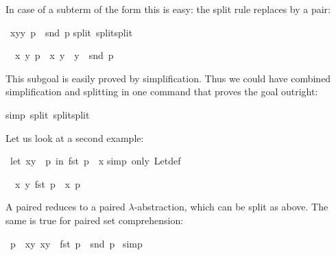 \begin{isabellebody}
\begin{isamarkuptext}
In case of a subterm of the form  this is easy: the split
rule  replaces  by a pair:%
\end{isamarkuptext}%
\ {\isachardoublequote}{\isacharparenleft}{\isasymlambda}{\isacharparenleft}x{\isacharcomma}y{\isacharparenright}{\isachardot}y{\isacharparenright}\ p\ {\isacharequal}\ snd\ p{\isachardoublequote}\isanewline
{}split\ split{\isacharunderscore}split{\isacharparenright}%
\begin{isamarkuptxt}%
\begin{isabelle}%
\ {}{\isachardot}\ {\isasymforall}x\ y{\isachardot}\ p\ {\isacharequal}\ {\isacharparenleft}x{\isacharcomma}\ y{\isacharparenright}\ {\isasymlongrightarrow}\ y\ {\isacharequal}\ snd\ p%
\end{isabelle}
This subgoal is easily proved by simplification. Thus we could have combined
simplification and splitting in one command that proves the goal outright:%
\end{isamarkuptxt}%
simp\ split{\isacharcolon}\ split{\isacharunderscore}split{\isacharparenright}%
\begin{isamarkuptext}%
Let us look at a second example:%
\end{isamarkuptext}%
\ {\isachardoublequote}let\ {\isacharparenleft}x{\isacharcomma}y{\isacharparenright}\ {\isacharequal}\ p\ in\ fst\ p\ {\isacharequal}\ x{\isachardoublequote}\isanewline
{}simp\ only{\isacharcolon}\ Let{\isacharunderscore}def{\isacharparenright}%
\begin{isamarkuptxt}%
\begin{isabelle}%
\ {}{\isachardot}\ {\isacharparenleft}{\isasymlambda}{\isacharparenleft}x{\isacharcomma}\ y{\isacharparenright}{\isachardot}\ fst\ p\ {\isacharequal}\ x{\isacharparenright}\ p%
\end{isabelle}
A paired  reduces to a paired $\lambda$-abstraction, which
can be split as above. The same is true for paired set comprehension:%
\end{isamarkuptxt}%
\ {\isachardoublequote}p\ {\isasymin}\ {\isacharbraceleft}{\isacharparenleft}x{\isacharcomma}y{\isacharparenright}{\isachardot}\ x{\isacharequal}y{\isacharbraceright}\ {\isasymlongrightarrow}\ fst\ p\ {\isacharequal}\ snd\ p{\isachardoublequote}\isanewline
{}\ simp%
\begin{isamarkuptxt}%

\end{isamarkuptxt}
\end{isabellebody}
